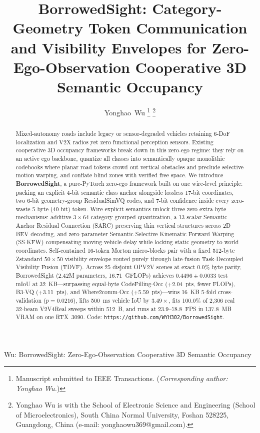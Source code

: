 \documentclass[journal]{IEEEtran}
\begin{document}
\title{BorrowedSight: Category-Geometry Token Communication and Visibility Envelopes for Zero-Ego-Observation Cooperative 3D Semantic Occupancy}

\author{Yonghao~Wu%
\thanks{Manuscript submitted to IEEE Transactions. (\textit{Corresponding author: Yonghao Wu.})}%
\thanks{Yonghao Wu is with the School of Electronic Science and Engineering (School of Microelectronics), South China Normal University, Foshan 528225, Guangdong, China (e-mail: yonghaowu369@gmail.com).}}

%
{Wu: BorrowedSight: Zero-Ego-Observation Cooperative 3D Semantic Occupancy}

\maketitle

\begin{abstract}
Mixed-autonomy roads include legacy or sensor-degraded vehicles retaining 6-DoF localization and V2X radios yet zero functional perception sensors. Existing cooperative 3D occupancy frameworks break down in this zero-ego regime: they rely on an active ego backbone, quantize all classes into semantically opaque monolithic codebooks where planar road tokens crowd out vertical obstacles and preclude selective motion warping, and conflate blind zones with verified free space. We introduce \textbf{BorrowedSight}, a pure-PyTorch zero-ego framework built on one wire-level principle: packing an explicit 4-bit semantic class anchor alongside lossless 17-bit coordinates, two 6-bit geometry-group ResidualSimVQ codes, and 7-bit confidence inside every zero-waste 5-byte (40-bit) token. Wire-explicit semantics unlock three zero-extra-byte mechanisms: additive $3\times 64$ category-grouped quantization, a 13-scalar Semantic Anchor Residual Connection (SARC) preserving thin vertical structures across 2D BEV decoding, and zero-parameter Semantic-Selective Kinematic Forward Warping (SS-KFW) compensating moving-vehicle delay while locking static geometry to world coordinates. Self-contained 16-token Morton micro-blocks pair with a fixed 512-byte Zstandard $50\times 50$ visibility envelope routed purely through late-fusion Task-Decoupled Visibility Fusion (TDVF). Across 25 disjoint OPV2V scenes at exact 0.0\% byte parity, BorrowedSight (2.42M parameters, 16.71~GFLOPs) achieves $0.4496 \pm 0.0033$ test mIoU at 32~KB---surpassing equal-byte CodeFilling-Occ (+2.04~pts, fewer FLOPs), B3-VQ (+3.11~pts), and Where2comm-Occ (+5.59~pts)---wins 16~KB 5-fold cross-validation ($p = 0.0216$), lifts 500~ms vehicle IoU by $3.49\times$, fits 100.0\% of 2,306 real 32-beam V2V4Real sweeps within 512~B, and runs at 23.9--78.8~FPS in 137.8~MB VRAM on one RTX~3090. Code: \texttt{https://github.com/WYH302/BorrowedSight}.
\end{abstract}
\end{document}
